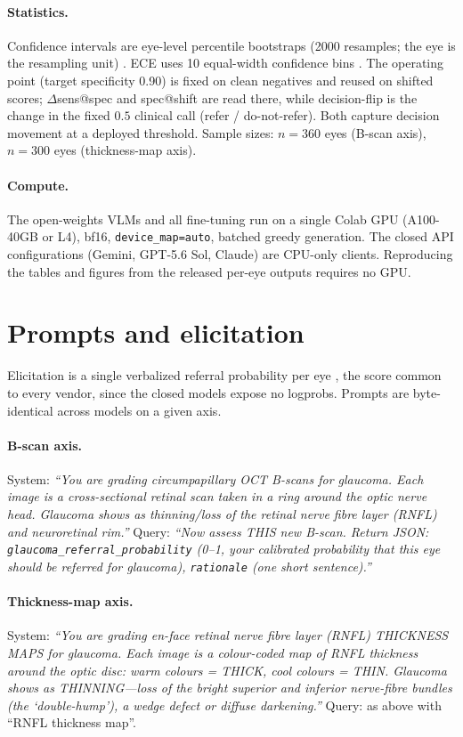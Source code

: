 \paragraph{Statistics.} Confidence intervals are eye-level percentile bootstraps (2000 resamples; the eye is the
resampling unit) \citep{diciccio1996bootstrap}. ECE uses 10 equal-width confidence bins \citep{guo2017calibration}. The operating point (target specificity 0.90) is fixed on
clean negatives and reused on shifted scores; $\Delta$sens@spec and spec@shift are read there, while decision-flip
is the change in the fixed $0.5$ clinical call (refer / do-not-refer). Both capture decision movement at a
deployed threshold. Sample sizes: $n{=}360$ eyes (B-scan axis), $n{=}300$ eyes (thickness-map
axis).

\paragraph{Compute.} The open-weights VLMs and all fine-tuning run on a single Colab GPU (A100-40GB or L4), bf16,
\texttt{device\_map=auto}, batched greedy generation. The closed API configurations (Gemini, GPT-5.6 Sol, Claude) are CPU-only
clients. Reproducing the tables and figures from the released per-eye outputs requires no GPU.

\section{Prompts and elicitation}
\label{app:prompts}

Elicitation is a single verbalized referral probability per eye \citep{tian2023calibration}, the score common to
every vendor, since the closed models expose no logprobs. Prompts are byte-identical across models on a given axis.

\paragraph{B-scan axis.} System: \emph{``You are grading circumpapillary OCT B-scans for glaucoma. Each
image is a cross-sectional retinal scan taken in a ring around the optic nerve head. Glaucoma shows as thinning/loss
of the retinal nerve fibre layer (RNFL) and neuroretinal rim.''} Query: \emph{``Now assess THIS new B-scan. Return
JSON: \texttt{glaucoma\_referral\_probability} (0--1, your calibrated probability that this eye should be referred
for glaucoma), \texttt{rationale} (one short sentence).''}

\paragraph{Thickness-map axis.} System: \emph{``You are grading en-face retinal nerve fibre layer (RNFL) THICKNESS
MAPS for glaucoma. Each image is a colour-coded map of RNFL thickness around the optic disc: warm colours = THICK,
cool colours = THIN. Glaucoma shows as THINNING---loss of the bright superior and inferior nerve-fibre bundles (the
`double-hump'), a wedge defect or diffuse darkening.''} Query: as above with ``RNFL thickness map''.

